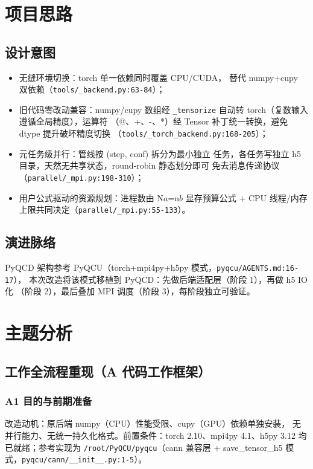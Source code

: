 \documentclass[UTF8]{ctexart}
\begin{document}
\section{项目思路}

\subsection{设计意图}
\begin{itemize}
\item \textcolor{idea}{无缝环境切换}：torch 单一依赖同时覆盖 CPU/CUDA，
替代 numpy+cupy 双依赖（\texttt{\nolinkurl{tools/_backend.py:63-84}}）；
\item \textcolor{idea}{旧代码零改动兼容}：numpy/cupy 数组经
\texttt{\nolinkurl{_tensorize}} 自动转 torch（复数输入遵循全局精度），运算符
（@、+、-、*）经 Tensor 补丁统一转换，避免 dtype 提升破坏精度切换
（\texttt{\nolinkurl{tools/_torch_backend.py:168-205}}）；
\item \textcolor{idea}{元任务级并行}：管线按 (step, conf) 拆分为最小独立
任务，各任务写独立 h5 目录，天然无共享状态，round-robin 静态划分即可
免去消息传递协议（\texttt{\nolinkurl{parallel/_mpi.py:198-310}}）；
\item \textcolor{idea}{用户公式驱动的资源规划}：进程数由
N$a$=n$b$ 显存预算公式 + CPU 线程/内存上限共同决定（\texttt{\nolinkurl{parallel/_mpi.py:55-133}}）。
\end{itemize}

\subsection{演进脉络}
PyQCD 架构参考 PyQCU（torch+mpi4py+h5py 模式，\texttt{\nolinkurl{pyqcu/AGENTS.md:16-17}}），
本次改造将该模式移植到 PyQCD：先做后端适配层（阶段 1），再做 h5 IO 化
（阶段 2），最后叠加 MPI 调度（阶段 3），每阶段独立可验证。

\section{主题分析}

\subsection{工作全流程重现（A 代码工作框架）}

\subsubsection{A1 目的与前期准备}
改造动机：原后端 numpy（CPU）性能受限、cupy（GPU）依赖单独安装，
无并行能力、无统一持久化格式。前置条件：torch 2.10、mpi4py 4.1、h5py
3.12 均已就绪；参考实现为 \texttt{\nolinkurl{/root/PyQCU/pyqcu}}（cann 兼容层 +
save\_tensor\_h5 模式，\texttt{\nolinkurl{pyqcu/cann/__init__.py:1-5}}）。
\end{document}
